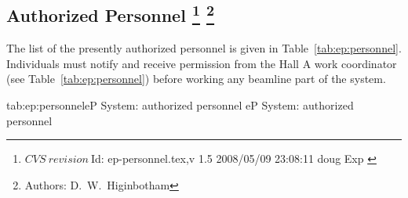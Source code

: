 \begin{safetyen}{0}{0}
\section[Authorized  Personnel]{Authorized  Personnel
\footnote{
   $CVS~revision~ $Id: ep-personnel.tex,v 1.5 2008/05/09 23:08:11 doug Exp $ $
 }
\footnote{Authors: D.~W.~Higinbotham }
}
\end{safetyen}
%
%
The list
of the presently authorized personnel is given in Table~\ref{tab:ep:personnel}.
Individuals must notify and receive permission from
the Hall A work coordinator (see Table~\ref{tab:ep:personnel}) before working any beamline part 
of the system.  
\begin{namestab}{tab:ep:personnel}{eP System: authorized personnel}{%
   eP System: authorized personnel}
\end{namestab}

%
%
%
%
%
%

